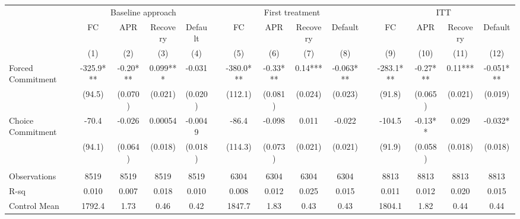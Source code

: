 \begin{tabular}{lcccccccccccccc}
\toprule
      & \multicolumn{4}{c}{Baseline approach} &       & \multicolumn{4}{c}{First treatment} &       & \multicolumn{4}{c}{ITT} \\
\cmidrule{2-5}\cmidrule{7-10}\cmidrule{12-15}      & FC    & APR   & Recovery & Default &       & FC    & APR   & Recovery & Default &       & FC    & APR   & Recovery & Default \\
\midrule
      & (1)   & (2)   & (3)   & (4)   &       & (5)   & (6)   & (7)   & (8)   &       & (9)   & (10)  & (11)  & (12) \\
\midrule
\midrule
Forced Commitment & -325.9*** & -0.20*** & 0.099*** & -0.031 &       & -380.0*** & -0.33*** & 0.14*** & -0.063*** &       & -283.1*** & -0.27*** & 0.11*** & -0.051*** \\
      & (94.5) & (0.070) & (0.021) & (0.020) &       & (112.1) & (0.081) & (0.024) & (0.023) &       & (91.8) & (0.065) & (0.021) & (0.019) \\
Choice Commitment & -70.4 & -0.026 & 0.00054 & -0.0049 &       & -86.4 & -0.098 & 0.011 & -0.022 &       & -104.5 & -0.13** & 0.029 & -0.032* \\
      & (94.1) & (0.064) & (0.018) & (0.018) &       & (114.3) & (0.073) & (0.021) & (0.021) &       & (91.9) & (0.058) & (0.018) & (0.018) \\
      &       &       &       &       &       &       &       &       &       &       &       &       &       &  \\
\midrule
Observations & 8519  & 8519  & 8519  & 8519  &       & 6304  & 6304  & 6304  & 6304  &       & 8813  & 8813  & 8813  & 8813 \\
R-sq  & 0.010 & 0.007 & 0.018 & 0.010 &       & 0.008 & 0.012 & 0.025 & 0.015 &       & 0.011 & 0.012 & 0.020 & 0.015 \\
Control Mean & 1792.4 & 1.73  & 0.46  & 0.42  &       & 1847.7 & 1.83  & 0.43  & 0.43  &       & 1804.1 & 1.82  & 0.44  & 0.44 \\
\bottomrule
\bottomrule
\end{tabular}%
